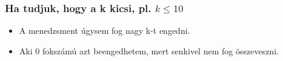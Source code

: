 \begin{frame}
\frametitle{Ha tudjuk, hogy a k kicsi, pl. $k\leq{}10$}
\begin{itemize}
\item A menedzsment úgysem fog nagy k-t engedni.
\item Aki 0 fokszámú azt beengedhetem, mert senkivel nem fog összeveszni.
\end{itemize}
\end{frame}

